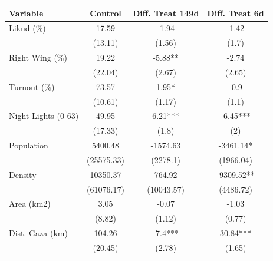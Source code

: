 \begin{table}[!h]
\centering
\begin{tabular}{lccc}
\toprule
Variable & Control & Diff. Treat 149d & Diff. Treat 6d\\
\midrule
Likud (\%) & 17.59 & -1.94 & -1.42\\
 & (13.11) & (1.56) & (1.7)\\
Right Wing (\%) & 19.22 & -5.88** & -2.74\\
 & (22.04) & (2.67) & (2.65)\\
Turnout (\%) & 73.57 & 1.95* & -0.9\\
\addlinespace
 & (10.61) & (1.17) & (1.1)\\
Night Lights (0-63) & 49.95 & 6.21*** & -6.45***\\
 & (17.33) & (1.8) & (2)\\
Population & 5400.48 & -1574.63 & -3461.14*\\
 & (25575.33) & (2278.1) & (1966.04)\\
\addlinespace
Density & 10350.37 & 764.92 & -9309.52**\\
 & (61076.17) & (10043.57) & (4486.72)\\
Area (km2) & 3.05 & -0.07 & -1.03\\
 & (8.82) & (1.12) & (0.77)\\
Dist. Gaza (km) & 104.26 & -7.4*** & 30.84***\\
\addlinespace
 & (20.45) & (2.78) & (1.65)\\
\bottomrule
\end{tabular}
\end{table}
